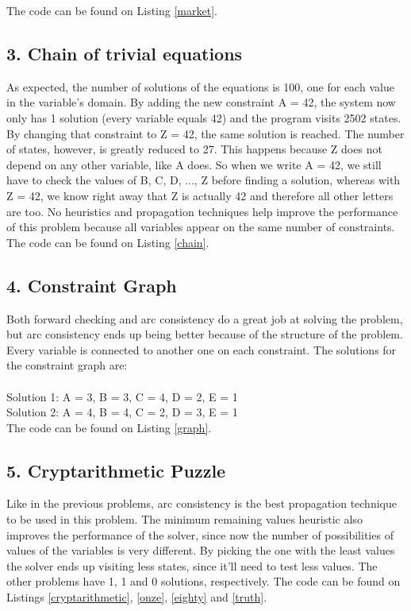 \documentclass{article}
\begin{document}
The code can be found on Listing \ref{market}.



\subsection*{3.   Chain of trivial equations}

As expected, the number of solutions of the equations is 100, one for each value in the variable's domain. By adding the new constraint A = 42, the system now only has 1 solution (every variable equals 42) and the program visits 2502 states. By changing that constraint to Z = 42, the same solution is reached. The number of states, however, is greatly reduced to 27.	This happens because Z does not depend on any other variable, like A does. So when we write A = 42, we still have to check the values of B, C, D, ..., Z before finding a solution, whereas with Z = 42, we know right away that Z is actually 42 and therefore all other letters are too. No heuristics and propagation techniques help improve the performance of this problem because all variables appear on the same number of constraints. The code can be found on Listing \ref{chain}.



\subsection*{4.   Constraint Graph}
Both forward checking and arc consistency do a great job at solving the problem, but arc consistency ends up being better because of the structure of the problem. Every variable is connected to another one on each constraint. The solutions for the constraint graph are: \\\\
Solution 1:
A = 	3,
B = 	3, 
C = 	4, 
D = 	2, 
E = 	1 \\

Solution 2:
A = 	4, 
B = 	4, 
C = 	2, 
D = 	3, 
E = 	1 \\ 

The code can be found on Listing \ref{graph}.



\subsection*{5.   Cryptarithmetic Puzzle}
Like in the previous problems, arc consistency is the best propagation technique to be used in this problem. The minimum remaining values heuristic also improves the performance of the solver, since now the number of possibilities of values of the variables is very different. By picking the one with the least values the solver ends up visiting less states, since it'll need to test less values. The other problems have 1, 1 and 0 solutions, respectively.
The code can be found on Listings \ref{cryptarithmetic}, \ref{onze}, \ref{eighty} and \ref{truth}.
\end{document}
